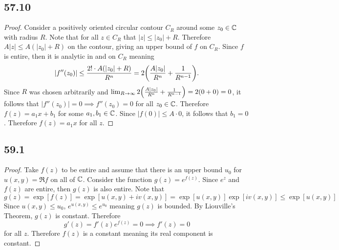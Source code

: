 \documentclass[12pt,titlepage]{extarticle}
\begin{document}
\subsection*{57.10}
\begin{proof}
    Consider a positively oriented circular contour $C_R$ around some $z_0 \in \mathbb{C}$ with radius $R$. Note that for all $z \in C_R$ that $|z| \leq |z_0| + R$. Therefore $A|z| \leq A(|z_0| + R)$ on the contour, giving an upper bound of $f$ on $C_R$. Since $f$ is entire, then it is analytic in and on $C_R$ meaning
    \[
        |f''(z_0)| \leq \frac{2! \cdot A (|z_0| + R)}{R^n} = 2\qty(\frac{A |z_0|}{R^n} + \frac{1}{R^{n-1}})
    .\]
    Since $R$ was chosen arbitrarily and $\lim_{R \to \infty} 2\qty(\frac{A |z_0|}{R^n} + \frac{1}{R^{n-1}}) = 2 (0 + 0) = 0$, it follows that $|f''(z_0)| = 0 \implies f''(z_0) = 0$ for all $z_0 \in \mathbb{C}$. Therefore $f(z) = a_1x + b_1$ for some $a_1, b_1 \in \mathbb{C}$. Since $|f(0)| \leq A \cdot 0$, it follows that $b_1 = 0$. Therefore $f(z) = a_1 x$ for all $z$.
\end{proof}

\subsection*{59.1}
\begin{proof}
    Take $f(z)$ to be entire and assume that there is an upper bound $u_0$ for $u(x,y) = \Re f$ on all of $\mathbb{C}$. Consider the function $g(z) = e^{f(z)}$. Since $e^z$ and $f(z)$ are entire, then $g(z)$ is also entire. Note that
    \[
        g(z) = \exp[f(z)] = \exp[u(x,y) + iv(x,y)] = \exp[u(x,y)]\exp[iv(x,y)] \leq \exp[u(x,y)]
    \]
    Since $u(x,y) \leq u_0$, $e^{u(x,y)} \leq e^{u_0}$ meaning $g(z)$ is bounded. By Liouville's Theorem, $g(z)$ is constant. Therefore
    \[
        g'(z) = f'(z) e^{f(z)} = 0 \implies f'(z) = 0
    \]
    for all $z$. Therefore $f(z)$ is a constant meaning its real component is constant.
\end{proof}
\end{document}
